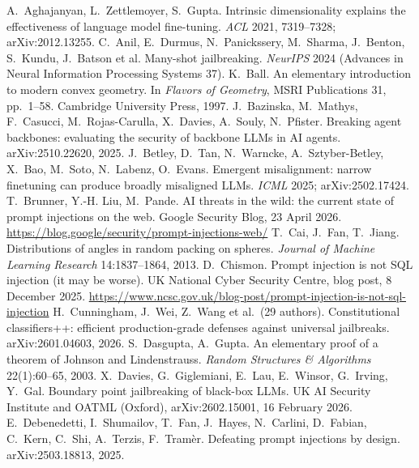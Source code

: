  A.~Aghajanyan, L.~Zettlemoyer, S.~Gupta. Intrinsic dimensionality explains the effectiveness of language model fine-tuning. \emph{ACL} 2021, 7319--7328; arXiv:2012.13255.
 C.~Anil, E.~Durmus, N.~Panickssery, M.~Sharma, J.~Benton, S.~Kundu, J.~Batson et al. Many-shot jailbreaking. \emph{NeurIPS} 2024 (Advances in Neural Information Processing Systems 37).
 K.~Ball. An elementary introduction to modern convex geometry. In \emph{Flavors of Geometry}, MSRI Publications 31, pp.~1--58. Cambridge University Press, 1997.
 J.~Bazinska, M.~Mathys, F.~Casucci, M.~Rojas-Carulla, X.~Davies, A.~Souly, N.~Pfister. Breaking agent backbones: evaluating the security of backbone LLMs in AI agents. arXiv:2510.22620, 2025.
 J.~Betley, D.~Tan, N.~Warncke, A.~Sztyber-Betley, X.~Bao, M.~Soto, N.~Labenz, O.~Evans. Emergent misalignment: narrow finetuning can produce broadly misaligned LLMs. \emph{ICML} 2025; arXiv:2502.17424.
 T.~Brunner, Y.-H. Liu, M.~Pande. AI threats in the wild: the current state of prompt injections on the web. Google Security Blog, 23 April 2026. \url{https://blog.google/security/prompt-injections-web/}
 T.~Cai, J.~Fan, T.~Jiang. Distributions of angles in random packing on spheres. \emph{Journal of Machine Learning Research} 14:1837--1864, 2013.
 D.~Chismon. Prompt injection is not SQL injection (it may be worse). UK National Cyber Security Centre, blog post, 8 December 2025. \url{https://www.ncsc.gov.uk/blog-post/prompt-injection-is-not-sql-injection}
 H.~Cunningham, J.~Wei, Z.~Wang et al.\ (29 authors). Constitutional classifiers++: efficient production-grade defenses against universal jailbreaks. arXiv:2601.04603, 2026.
 S.~Dasgupta, A.~Gupta. An elementary proof of a theorem of Johnson and Lindenstrauss. \emph{Random Structures \& Algorithms} 22(1):60--65, 2003.
 X.~Davies, G.~Giglemiani, E.~Lau, E.~Winsor, G.~Irving, Y.~Gal. Boundary point jailbreaking of black-box LLMs. UK AI Security Institute and OATML (Oxford), arXiv:2602.15001, 16 February 2026.
 E.~Debenedetti, I.~Shumailov, T.~Fan, J.~Hayes, N.~Carlini, D.~Fabian, C.~Kern, C.~Shi, A.~Terzis, F.~Tram\`er. Defeating prompt injections by design. arXiv:2503.18813, 2025.
